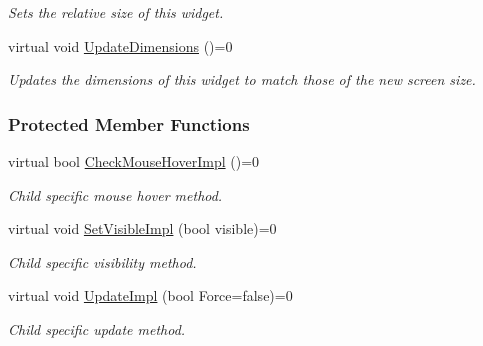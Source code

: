 \begin{DoxyCompactItemize}
\begin{DoxyCompactList}\small\item\em Sets the relative size of this widget. \item\end{DoxyCompactList}\item 
virtual void \hyperlink{classMezzanine_1_1UI_1_1Cell_a20af52a9a939d90b50a42b9c967c64d7}{UpdateDimensions} ()=0
\begin{DoxyCompactList}\small\item\em Updates the dimensions of this widget to match those of the new screen size. \item\end{DoxyCompactList}\end{DoxyCompactItemize}
\subsubsection*{Protected Member Functions}
\begin{DoxyCompactItemize}
\item 
\hypertarget{classMezzanine_1_1UI_1_1Cell_af0ee8e775513f8e99dc84e88be16639b}{
virtual bool \hyperlink{classMezzanine_1_1UI_1_1Cell_af0ee8e775513f8e99dc84e88be16639b}{CheckMouseHoverImpl} ()=0}
\label{classMezzanine_1_1UI_1_1Cell_af0ee8e775513f8e99dc84e88be16639b}

\begin{DoxyCompactList}\small\item\em Child specific mouse hover method. \item\end{DoxyCompactList}\item 
\hypertarget{classMezzanine_1_1UI_1_1Cell_a9d8dfaaeac0cfff40e39467760d4df66}{
virtual void \hyperlink{classMezzanine_1_1UI_1_1Cell_a9d8dfaaeac0cfff40e39467760d4df66}{SetVisibleImpl} (bool visible)=0}
\label{classMezzanine_1_1UI_1_1Cell_a9d8dfaaeac0cfff40e39467760d4df66}

\begin{DoxyCompactList}\small\item\em Child specific visibility method. \item\end{DoxyCompactList}\item 
\hypertarget{classMezzanine_1_1UI_1_1Cell_ac0f9370055c6e74cebc67ecd6e84b284}{
virtual void \hyperlink{classMezzanine_1_1UI_1_1Cell_ac0f9370055c6e74cebc67ecd6e84b284}{UpdateImpl} (bool Force=false)=0}
\label{classMezzanine_1_1UI_1_1Cell_ac0f9370055c6e74cebc67ecd6e84b284}

\begin{DoxyCompactList}\small\item\em Child specific update method. \item\end{DoxyCompactList}\end{DoxyCompactItemize}
